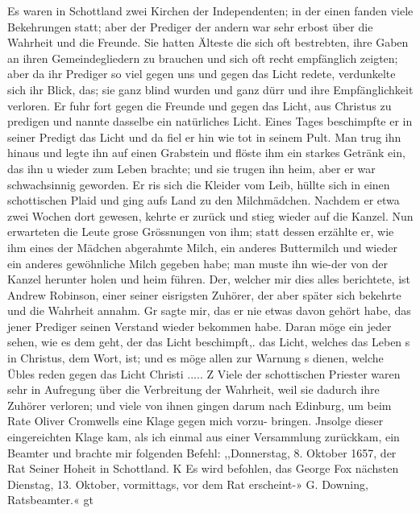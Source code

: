 Es waren in Schottland zwei Kirchen der 
Independenten;
in der einen fanden viele Bekehrungen statt; aber der 
Prediger der andern war sehr erbost über die Wahrheit und die
Freunde. Sie hatten Älteste die sich oft bestrebten, ihre Gaben
an ihren Gemeindegliedern zu brauchen und sich oft recht empfänglich
zeigten; aber da ihr Prediger so viel gegen uns und gegen das
Licht redete, verdunkelte sich ihr Blick, das; sie ganz blind wurden
und ganz dürr und ihre Empfänglichkeit verloren. Er fuhr fort
gegen die Freunde und gegen das Licht, aus Christus zu
predigen und nannte dasselbe ein natürliches Licht. Eines Tages
beschimpfte er in seiner Predigt das Licht und da fiel er hin wie
tot in seinem Pult. Man trug ihn hinaus und legte ihn auf
einen Grabstein und flöste ihm ein starkes Getränk ein, das ihn u
wieder zum Leben brachte; und sie trugen ihn heim, aber er war
schwachsinnig geworden. Er ris sich die Kleider vom Leib, hüllte
sich in einen schottischen Plaid und ging aufs Land zu den
Milchmädchen. Nachdem er etwa zwei Wochen dort gewesen,
kehrte er zurück und stieg wieder auf die Kanzel. Nun erwarteten
die Leute grose Grössnungen von ihm; statt dessen erzählte er,
wie ihm eines der Mädchen abgerahmte Milch, ein anderes
Buttermilch und wieder ein anderes gewöhnliche Milch gegeben
habe; man muste ihn wie-der von der Kanzel herunter holen und
heim führen. Der, welcher mir dies alles berichtete, ist Andrew
Robinson, einer seiner eisrigsten Zuhörer, der aber später sich
bekehrte und die Wahrheit annahm. Gr sagte mir, das er nie
etwas davon gehört habe, das jener Prediger seinen Verstand
wieder bekommen habe. Daran möge ein jeder sehen, wie es
dem geht, der das Licht beschimpft,. das Licht, welches das Leben s
in Christus, dem Wort, ist; und es möge allen zur Warnung s
dienen, welche Übles reden gegen das Licht Christi ..... Z
Viele der schottischen Priester waren sehr in Aufregung über
die Verbreitung der Wahrheit, weil sie dadurch ihre Zuhörer
verloren; und viele von ihnen gingen darum nach Edinburg,
um beim Rate Oliver Cromwells eine Klage gegen mich vorzu-
bringen. Jnsolge dieser eingereichten Klage kam, als ich einmal
aus einer Versammlung zurückkam, ein Beamter und brachte mir
folgenden Befehl:
,,Donnerstag, 8. Oktober 1657, der Rat Seiner Hoheit in
Schottland.
K Es wird befohlen, das George Fox nächsten Dienstag,
13. Oktober, vormittags, vor dem Rat erscheint-»
G. Downing, Ratsbeamter.«
gt



